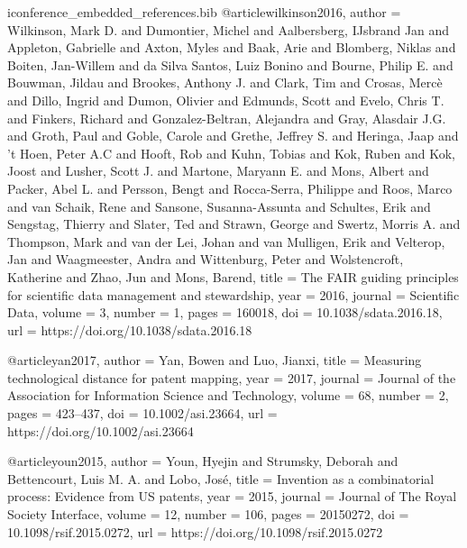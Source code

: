 \begin{filecontents*}[overwrite]{iconference_embedded_references.bib}
@article{wilkinson2016,
  author = {Wilkinson, Mark D. and Dumontier, Michel and Aalbersberg, IJsbrand Jan and Appleton, Gabrielle and Axton, Myles and Baak, Arie and Blomberg, Niklas and Boiten, Jan-Willem and da Silva Santos, Luiz Bonino and Bourne, Philip E. and Bouwman, Jildau and Brookes, Anthony J. and Clark, Tim and Crosas, Merc{\`{e}} and Dillo, Ingrid and Dumon, Olivier and Edmunds, Scott and Evelo, Chris T. and Finkers, Richard and Gonzalez-Beltran, Alejandra and Gray, Alasdair J.G. and Groth, Paul and Goble, Carole and Grethe, Jeffrey S. and Heringa, Jaap and 't Hoen, Peter A.C and Hooft, Rob and Kuhn, Tobias and Kok, Ruben and Kok, Joost and Lusher, Scott J. and Martone, Maryann E. and Mons, Albert and Packer, Abel L. and Persson, Bengt and Rocca-Serra, Philippe and Roos, Marco and van Schaik, Rene and Sansone, Susanna-Assunta and Schultes, Erik and Sengstag, Thierry and Slater, Ted and Strawn, George and Swertz, Morris A. and Thompson, Mark and van der Lei, Johan and van Mulligen, Erik and Velterop, Jan and Waagmeester, Andra and Wittenburg, Peter and Wolstencroft, Katherine and Zhao, Jun and Mons, Barend},
  title = {The {FAIR} guiding principles for scientific data management and stewardship},
  year = {2016},
  journal = {Scientific Data},
  volume = {3},
  number = {1},
  pages = {160018},
  doi = {10.1038/sdata.2016.18},
  url = {https://doi.org/10.1038/sdata.2016.18}
}

@article{yan2017,
  author = {Yan, Bowen and Luo, Jianxi},
  title = {Measuring technological distance for patent mapping},
  year = {2017},
  journal = {Journal of the Association for Information Science and Technology},
  volume = {68},
  number = {2},
  pages = {423--437},
  doi = {10.1002/asi.23664},
  url = {https://doi.org/10.1002/asi.23664}
}

@article{youn2015,
  author = {Youn, Hyejin and Strumsky, Deborah and Bettencourt, Luis M. A. and Lobo, Jos{\'{e}}},
  title = {Invention as a combinatorial process: Evidence from {US} patents},
  year = {2015},
  journal = {Journal of The Royal Society Interface},
  volume = {12},
  number = {106},
  pages = {20150272},
  doi = {10.1098/rsif.2015.0272},
  url = {https://doi.org/10.1098/rsif.2015.0272}
}

\end{filecontents*}
\documentclass[12pt]{article}
\usepackage[a4paper,margin=1in,bottom=35mm]{geometry}
\usepackage{titlesec}
\usepackage[table]{xcolor}
